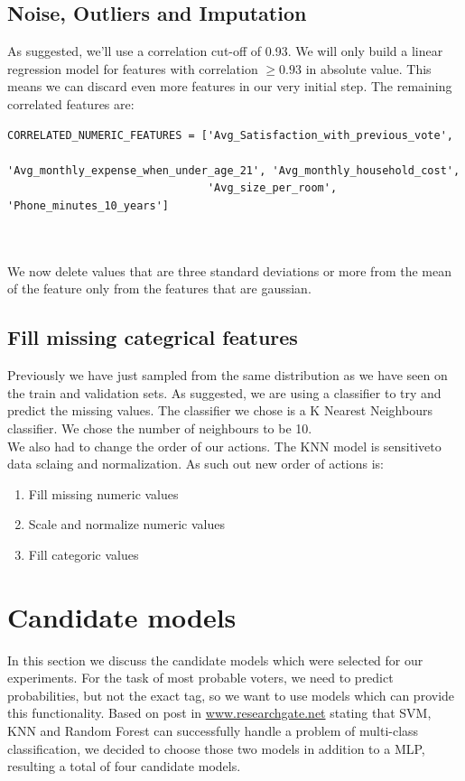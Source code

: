 \documentclass[12pt]{article}
\begin{document}
\subsection{Noise, Outliers and Imputation}
As suggested, we'll use a correlation cut-off of 0.93. We will only build a linear regression model for features with correlation $\geq 0.93$ in absolute value. This means we can discard even more features in our very initial step. The remaining correlated features are:\\

\begin{adjustbox}{max width=\linewidth}
\begin{lstlisting}
CORRELATED_NUMERIC_FEATURES = ['Avg_Satisfaction_with_previous_vote',
                               'Avg_monthly_expense_when_under_age_21', 'Avg_monthly_household_cost',
                               'Avg_size_per_room', 'Phone_minutes_10_years']
\end{lstlisting}
\end{adjustbox}\\
\\

We now delete values that are three standard deviations or more from the mean of the feature only from the features that are gaussian.

\subsection{Fill missing categrical features}
Previously we have just sampled from the same distribution as we have seen on the train and validation sets. As suggested, we are using a classifier to try and predict the missing values. The classifier we chose is a K Nearest Neighbours classifier. We chose the number of neighbours to be 10.\\
We also had to change the order of our actions. The KNN model is sensitiveto data sclaing and normalization. As such out new order of actions is:
\begin{enumerate}
\item Fill missing numeric values
\item Scale and normalize numeric values
\item Fill categoric values
\end{enumerate}

\newpage
\section{Candidate models}
In this section we discuss the candidate models which were selected for our experiments. For the task of most probable voters, we need to predict probabilities, but not the exact tag, so we want to use models which can provide this functionality. Based on post in \href{https://www.researchgate.net/post/What_are_the_best_supervised_classifiers_to_classify_the_problem_of_multiclass_classification}{www.researchgate.net} stating that SVM, KNN and Random Forest can successfully handle a problem of multi-class classification, we decided to choose those two models in addition to a MLP, resulting a total of four candidate models.
\end{document}
